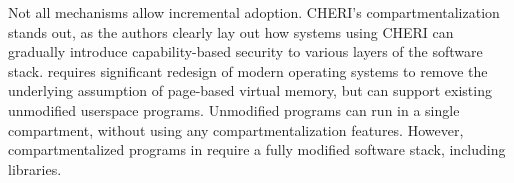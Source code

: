 Not all mechanisms allow incremental adoption.
CHERI's compartmentalization stands out, as the authors clearly lay out
how systems using CHERI can gradually introduce capability-based security
to various layers of the software stack.
\seccells requires significant redesign of modern operating systems to
remove the underlying assumption of page-based virtual memory,
but can support existing unmodified userspace programs.
Unmodified programs can run in a single compartment, without using any
compartmentalization features.
However, compartmentalized programs in \seccells require a fully modified
software stack, including libraries.







